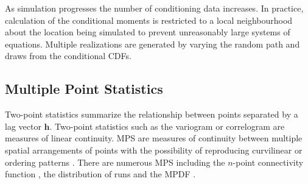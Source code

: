 As simulation progresses the number of conditioning data increases. In practice, calculation of the conditional moments is restricted to a local neighbourhood about the location being simulated to prevent unreasonably large systems of equations. Multiple realizations are generated by varying the random path and draws from the conditional \glspl{CDF}.






\FloatBarrier
\subsection{Multiple Point Statistics}
\label{subsec:01mps}

Two-point statistics summarize the relationship between points separated by a lag vector $\mathbf{h}$. Two-point statistics such as the variogram or correlogram are measures of linear continuity. \gls{MPS} are measures of continuity between multiple spatial arrangements of points with the possibility of reproducing curvilinear or ordering patterns \citep{boisvert2007multiplepoint}. There are numerous \gls{MPS} including the $n$-point connectivity function \citep{journel1989nongaussian}, the distribution of runs \citep{ortiz2003characterization} and the \gls{MPDF} \citep{boisvert2007multiplepoint}.

